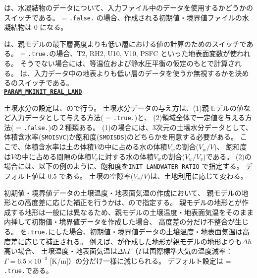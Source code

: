 は、水凝結物のデータについて、入力ファイル中のデータを使用するかどうかのスイッチである。
 = \verb|.false.| の場合、作成される初期値・境界値ファイルの水凝結物は 0 になる。

は、親モデルの最下層高度よりも低い層における値の計算のためのスイッチである。
 = \verb|.true.|の場合、T2, RH2, U10, V10, PSFC といった地表面変数が使われる。
そうでない場合には、等温位および静水圧平衡の仮定のもとで計算される。
は、入力データ中の地表よりも低い層のデータを使うか無視するかを決めるのスイッチである。
\\

\noindent\textbf{\underline{\texttt{PARAM\_MKINIT\_REAL\_LAND}}}

土壌水分の設定は、ので行う。
土壌水分データの与え方は、(1)親モデルの値など入力データとして与える方法( = \verb|.true.|)と、
(2)領域全体で一定値を与える方法( = \verb|.false.|)の２種類ある。
(1)の場合には、3次元の土壌水分データとして、
体積含水率(\verb|SMOISVC|)か飽和度(\verb|SMOISDS|)のどちらかを用意する必要がある。
ここで、体積含水率は土の体積$V$の中に占める水の体積$V_w$の割合($V_w / V$)、
飽和度は$V$の中に占める間隙の体積$V_v$に対する水の体積$V_w$の割合($V_w / V_v$)である。
%
(2)の場合には、以下の例のように、飽和度を\verb|INIT_LANDWATER_RATIO| で指定する。
デフォルト値は 0.5 である。
土壌の空隙率($V_v/V$)は、土地利用に応じて変わる。

初期値・境界値データの土壌温度・地表面気温の作成において、
親モデルの地形との高度差に応じた補正を行うかは、ので指定する。
親モデルの地形と\scalerm が作成する地形は一般には異なるため、親モデルの土壌温度・地表面気温をそのまま内挿して初期値・境界値データを作成した場合、
高度差の分だけ不整合が生じる。
を\verb|.true.|にした場合、初期値・境界値データの土壌温度・地表面気温は高度差に応じて補正される。
例えば、\scalerm が作成した地形が親モデルの地形よりも$\Delta h$高い場合、
土壌温度・地表面気温は$\Delta h\Gamma$（$\Gamma$は国際標準大気の温度減率：$\Gamma=6.5\times 10^{-3}$ [K/m]）の分だけ一様に減じられる。
デフォルト設定は = \verb|.true.|である。


